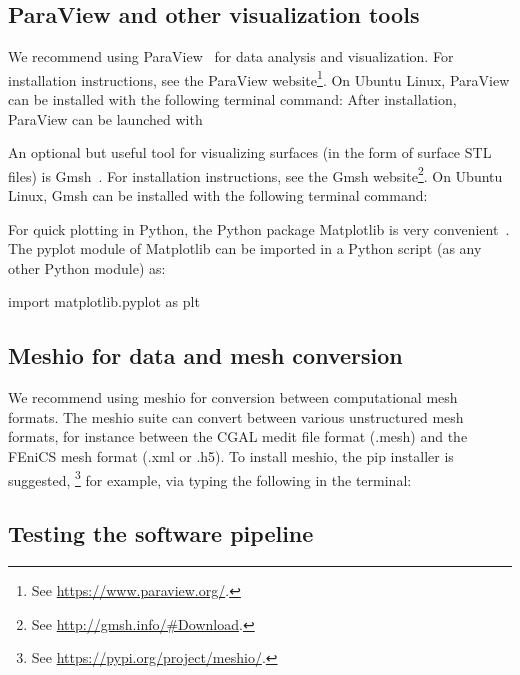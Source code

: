 \subsection{ParaView and other visualization tools}
\label{sec:chp2:paraview}

We recommend using ParaView~\cite{ahrens2005paraview} for data
analysis and visualization. For installation instructions, see the
ParaView website\footnote{See \url{https://www.paraview.org/}.}. On Ubuntu
Linux, ParaView can be installed with the following
terminal command:
\noindent After installation, ParaView can be launched with

An optional but useful tool for visualizing surfaces (in the form
of surface STL files) is Gmsh~\cite{geuzaine2009gmsh}. For installation
instructions, see the Gmsh
website\footnote{See \url{http://gmsh.info/\#Download}.}. On Ubuntu Linux,
Gmsh can be installed with the following terminal command:



For quick plotting in Python, the Python package Matplotlib
is very convenient~\cite{hunter2007matplotlib}. The pyplot module of
Matplotlib can be imported in a Python script (as any other Python
module) as:
\begin{python}
import matplotlib.pyplot as plt
\end{python}

\subsection{Meshio for data and mesh conversion}
\label{sec:chp2:meshio}

We recommend using meshio \cite{schlomer2020nschloe} for conversion
between computational mesh formats. The meshio suite can convert
between various unstructured mesh formats, for instance between the
CGAL medit file format (.mesh) and the FEniCS mesh format (.xml or
.h5). To install meshio, the pip installer is
suggested, \footnote{See \url{https://pypi.org/project/meshio/}.} for example, via typing the following in the terminal:

\subsection{Testing the software pipeline}
\label{sec:chp2:tools:testing}

